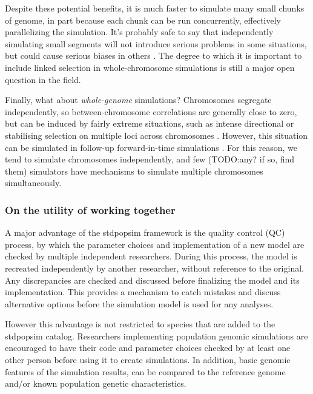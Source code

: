 \documentclass[hidelinks]{article}
\begin{document}
Despite these potential benefits, it is much faster to simulate many
small chunks of genome, in part because each chunk can be run
concurrently, effectively parallelizing the simulation. It's probably
safe to say that independently simulating small segments will not
introduce serious problems in some situations, but could cause serious
biases in others \citep[][e.g.,]{Nelson2020}. The degree to which it is
important to include linked selection in whole-chromosome simulations is
still a major open question in the field.

Finally, what about \emph{whole-genome} simulations? Chromosomes
segregate independently, so between-chromosome correlations are generally close
to zero, but can be induced by fairly extreme situations, such as intense
directional or stabilising selection on multiple loci across chromosomes
\citep{Bulmer1971, Lara2022}. However, this situation can be simulated in
follow-up forward-in-time simulations \citep{Haller2018, Gaynor2020}. For
this reason, we tend to simulate chromosomes independently, and few
(TODO:any? if so, find them) simulators have mechanisms to simulate
multiple chromosomes simultaneously.

\hypertarget{on-the-utility-of-working-together}{%
\subsubsection*{On the utility of working
together}\label{on-the-utility-of-working-together}}

A major advantage of the stdpopsim framework is the quality control (QC)
process, by which the parameter choices and implementation of a new
model are checked by multiple independent researchers. During this
process, the model is recreated independently by another researcher,
without reference to the original. Any discrepancies are checked and
discussed before finalizing the model and its implementation. This
provides a mechanism to catch mistakes and discuss alternative options
before the simulation model is used for any analyses.

However this advantage is not restricted to species that are added to
the stdpopsim catalog. Researchers implementing population genomic
simulations are encouraged to have their code and parameter choices
checked by at least one other person before using it to create
simulations. In addition, basic genomic features of the simulation
results, can be compared to the reference genome and/or known population
genetic characteristics.
\end{document}
